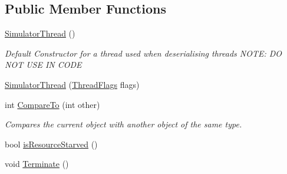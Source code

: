 \subsection*{Public Member Functions}
\begin{DoxyCompactItemize}
\item 
\hyperlink{class_c_p_u___o_s___simulator_1_1_operating___system_1_1_threading_1_1_simulator_thread_a66fbb2c9cf125ffc9bd65146ae027061}{Simulator\+Thread} ()
\begin{DoxyCompactList}\small\item\em Default Constructor for a thread used when deserialising threads N\+O\+T\+E\+: D\+O N\+O\+T U\+S\+E I\+N C\+O\+D\+E \end{DoxyCompactList}\item 
\hyperlink{class_c_p_u___o_s___simulator_1_1_operating___system_1_1_threading_1_1_simulator_thread_a5d125ba6d5330303a3fef35330ffd29f}{Simulator\+Thread} (\hyperlink{struct_c_p_u___o_s___simulator_1_1_operating___system_1_1_threading_1_1_thread_flags}{Thread\+Flags} flags)
\item 
int \hyperlink{class_c_p_u___o_s___simulator_1_1_operating___system_1_1_threading_1_1_simulator_thread_a05dbf38651dbb504de37bd2760d0de8f}{Compare\+To} (int other)
\begin{DoxyCompactList}\small\item\em Compares the current object with another object of the same type. \end{DoxyCompactList}\item 
bool \hyperlink{class_c_p_u___o_s___simulator_1_1_operating___system_1_1_threading_1_1_simulator_thread_a183c6367f7578ed62426cd1da886a801}{is\+Resource\+Starved} ()
\item 
void \hyperlink{class_c_p_u___o_s___simulator_1_1_operating___system_1_1_threading_1_1_simulator_thread_af82f3fb3e4b1140ed5ef2ec95fe8bfca}{Terminate} ()
\end{DoxyCompactItemize}
